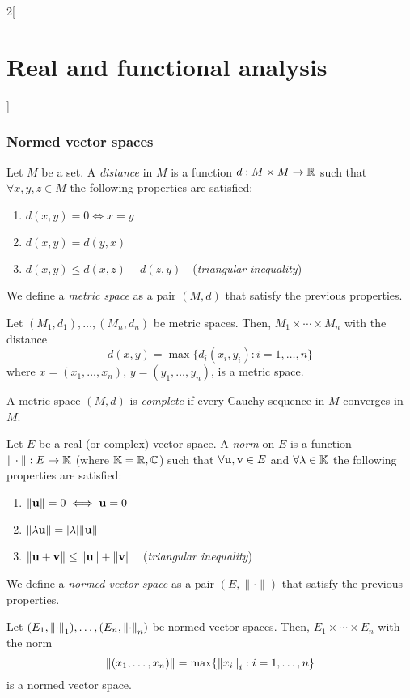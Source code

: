 \documentclass[../../../main_math.tex]{subfiles}
\begin{document}
\begin{multicols}{2}[\section{Real and functional analysis}]
  \subsubsection{Normed vector spaces}
  \begin{definition}
    Let $M$ be a set. A \emph{distance} in $M$ is a function $d:M\times M\rightarrow\mathbb{R} $ such that $\forall x,y,z\in M$ the following properties are satisfied:
    \begin{enumerate}
      \item $d(x,y)=0\iff x=y$
      \item $d(x,y)=d(y,x)$
      \item $d(x,y)\leq d(x,z)+d(z,y)\quad$(\emph{triangular inequality})
    \end{enumerate}
    We define a \emph{metric space} as a pair $(M,d)$ that satisfy the previous properties.
  \end{definition}
  \begin{proposition}
    Let $(M_1,d_1),\ldots,(M_n,d_n)$ be metric spaces. Then, $M_1\times\cdots\times M_n$ with the distance $$d(x,y)=\max\{d_i(x_i,y_i):i=1,\ldots,n\}$$ where $x=(x_1,\ldots,x_n)$, $y=(y_1,\ldots,y_n)$, is a metric space.
  \end{proposition}
  \begin{definition}
    A metric space $(M,d)$ is \emph{complete} if every Cauchy sequence in $M$ converges in $M$.
  \end{definition}
  \begin{definition}
    Let $E$ be a real (or complex) vector space. A \emph{norm} on $E$ is a function $\|\cdot\|:E\rightarrow\mathbb{K}$ (where $\mathbb{K}=\mathbb{R},\mathbb{C}$) such that $\forall \boldsymbol{\mathrm{u}},\boldsymbol{\mathrm{v}}\in E$ and $\forall\lambda\in\mathbb{K} $ the following properties are satisfied:
    \begin{enumerate}[ref = Triangular inequality]
      \item $\|\boldsymbol{\mathrm{u}}\|=0\iff \boldsymbol{\mathrm{u}}=0$
      \item $\|\lambda \boldsymbol{\mathrm{u}}\|=|\lambda|\|\boldsymbol{\mathrm{u}}\|$
            \item\label{RFA:triangularineq} $\|\boldsymbol{\mathrm{u}}+\boldsymbol{\mathrm{v}}\|\leq \|\boldsymbol{\mathrm{u}}\|+\|\boldsymbol{\mathrm{v}}\|\quad$(\emph{triangular inequality})
    \end{enumerate}
    We define a \emph{normed vector space} as a pair $(E,\|\cdot\|)$ that satisfy the previous properties.
  \end{definition}
  \begin{proposition}
    Let $(E_1,\left\|\cdot\right\|_1),\ldots,(E_n,\left\|\cdot\right\|_n)$ be normed vector spaces. Then, $E_1\times\cdots\times E_n$ with the norm $$\left\|(x_1,\ldots,x_n)\right\|=\max\{{\left\|x_i\right\|}_i:i=1,\ldots,n\}$$ is a normed vector space.

\end{proposition}
\end{multicols}
\end{document}
